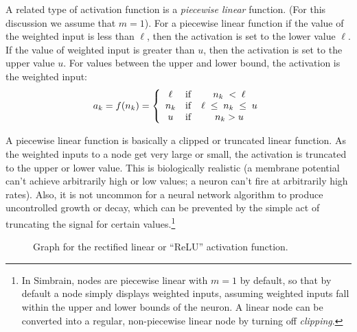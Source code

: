 A related type of activation function is a \emph{piecewise linear} function. (For this discussion we assume that $m=1$). For a piecewise linear function if the value of the weighted input is less than $\ell$, then the activation is set to the lower value $\ell$. If the value of weighted input is greater than $u$, then the activation is set to the upper value $u$. For values between the upper and lower bound, the activation is the weighted input:
\begin{eqnarray*}
a_k = f(n_k) =
\left\{
      \begin{array}{clc}
                  \ell      & {\rm if} &   n_k\; < \; \ell             \\
              n_k  & {\rm if} &  \ell \;\leq\; n_k \;\leq\; u \\
               u     & {\rm if} &    n_k > u
      \end{array}
\right.
\end{eqnarray*}

A piecewise linear function is basically a clipped or truncated linear function. As the weighted inputs to a node get very large or small, the activation is truncated to the upper or lower value. This is biologically realistic (a membrane potential can't achieve arbitrarily high or low values; a neuron can't fire at arbitrarily high rates). Also, it is not uncommon for a neural network algorithm to produce uncontrolled growth or decay, which can be prevented by the simple act of truncating the signal for certain values.\footnote{In Simbrain, nodes are piecewise linear with $m=1$ by default, so that by default a node simply displays weighted inputs, assuming weighted inputs fall within the upper and lower bounds of the neuron. A linear node can be converted into a regular, non-piecewise linear node by turning off  \emph{clipping}.}

\begin{figure}[h]
\centering
{}
\caption[Scott Hotton.]{Graph for the rectified linear or ``ReLU'' activation function.}
\label{relu}
\end{figure}

